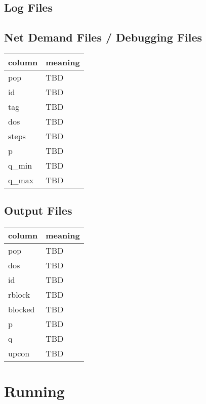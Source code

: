 \documentclass[12pt]{article}
\begin{document}
\subsection{Log Files}

\subsection{Net Demand Files / Debugging Files}

\begin{tabular} {| l | l |}
    \hline
    \textbf{column} & \textbf{meaning} \\ \hline
    pop & TBD \\ \hline
    id & TBD \\ \hline
    tag & TBD \\ \hline
    dos & TBD \\ \hline
    steps & TBD \\ \hline
    p & TBD \\ \hline
    q\_min & TBD \\ \hline
    q\_max & TBD \\ \hline
\end{tabular}

\subsection{Output Files}

\begin{tabular} {| l | l |}
    \hline
    \textbf{column} & \textbf{meaning} \\ \hline
    pop & TBD \\ \hline
    dos & TBD \\ \hline
    id & TBD \\ \hline
    rblock & TBD \\ \hline
    blocked & TBD \\ \hline
    p & TBD \\ \hline
    q & TBD \\ \hline
    upcon & TBD \\ \hline
\end{tabular}

\section{Running}

\end{document}
